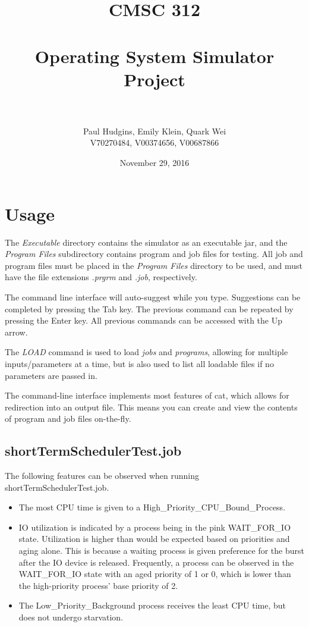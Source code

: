 \documentclass[paper=a4, fontsize=11pt]{scrartcl} %
\title{	
\normalfont \normalsize 
\textsc{CMSC 312} \\ [25pt] %
\horrule{0.5pt} \\[0.4cm] %
\huge Operating System Simulator Project \\ %
\horrule{2pt} \\[0.5cm] %
}
\author{Paul Hudgins, Emily Klein, Quark Wei%
\\ \normalsize V70270484, V00374656, V00687866}
\date{\normalsize November 29, 2016}%
\numberwithin{equation}{section} %
\numberwithin{figure}{section} %
\numberwithin{table}{section} %
\begin{document}
\maketitle %


\section{Usage}

The \textit{Executable} directory contains the simulator as an executable jar, and the \textit{Program Files} subdirectory contains program and job files for testing. All job and program files must be placed in the \textit{Program Files} directory to be used, and must have the file extensions \textit{.prgrm} and \textit{.job}, respectively.

The command line interface will auto-suggest while you type. Suggestions can be completed by pressing the Tab key. The previous command can be repeated by pressing the Enter key. All previous commands can be accessed with the Up arrow.

The \textit{LOAD} command is used to load \textit{jobs} and \textit{programs}, allowing for multiple inputs/parameters at a time, but is also used to list all loadable files if no parameters are passed in.

The command-line interface implements most features of cat, which allows for redirection into an output file. This means you can create and view the contents of program and job files on-the-fly.

\subsection{shortTermSchedulerTest.job}
The following features can be observed when running shortTermSchedulerTest.job.
\begin{itemize}
	\item The most CPU time is given to a High\_Priority\_CPU\_Bound\_Process.
	\item IO utilization is indicated by a process being in the pink WAIT\_FOR\_IO state. Utilization is higher than would be expected based on priorities and aging alone. This is because a waiting process is given preference for the burst after the IO device is released. Frequently, a process can be observed in the WAIT\_FOR\_IO state with an aged priority of 1 or 0, which is lower than the high-priority process' base priority of 2.
	\item The Low\_Priority\_Background process receives the least CPU time, but does not undergo starvation.
\end{itemize}
\end{document}
